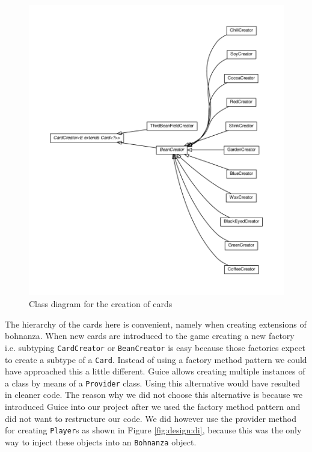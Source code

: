 \begin{figure}[h!]
    \includegraphics[width=\textwidth]{../umlgraph/CreatorGraph}
    \caption{Class diagram for the creation of cards}
    \label{fig:design:creator}
\end{figure}

The hierarchy of the cards here is convenient, namely when creating extensions of bohnanza. When new cards are introduced to the game
creating a new factory i.e. subtyping \texttt{CardCreator} or \texttt{BeanCreator} is easy because those factories expect to create a
subtype of a \texttt{Card}. Instead of using a factory method pattern we could have approached this a little different. Guice allows
creating multiple instances of a class by means of a \texttt{Provider} class. Using this alternative would have resulted in cleaner code. The reason why we
did not choose this alternative is because we introduced Guice into our project after we used the factory method pattern and did not want to
restructure our code. We did however use the provider method for creating \texttt{Player}s as shown in Figure \ref{fig:design:di}, because
this was the only way to inject these objects into an \texttt{Bohnanza} object.
 
